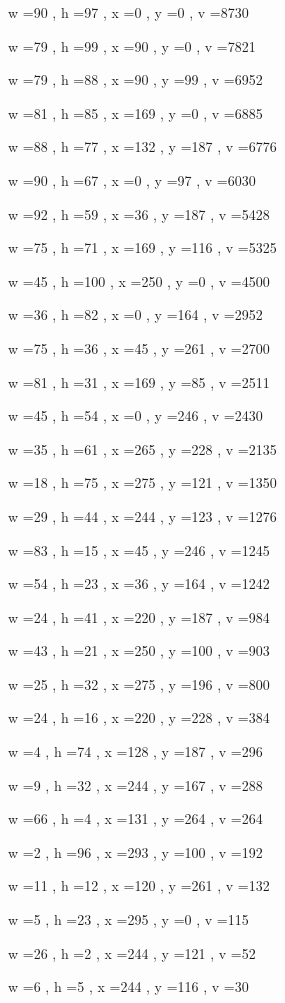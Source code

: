 \documentclass[11pt]{article}
\begin{document}
w =90 , h =97 , x =0 , y =0 , v =8730
\par
w =79 , h =99 , x =90 , y =0 , v =7821
\par
w =79 , h =88 , x =90 , y =99 , v =6952
\par
w =81 , h =85 , x =169 , y =0 , v =6885
\par
w =88 , h =77 , x =132 , y =187 , v =6776
\par
w =90 , h =67 , x =0 , y =97 , v =6030
\par
w =92 , h =59 , x =36 , y =187 , v =5428
\par
w =75 , h =71 , x =169 , y =116 , v =5325
\par
w =45 , h =100 , x =250 , y =0 , v =4500
\par
w =36 , h =82 , x =0 , y =164 , v =2952
\par
w =75 , h =36 , x =45 , y =261 , v =2700
\par
w =81 , h =31 , x =169 , y =85 , v =2511
\par
w =45 , h =54 , x =0 , y =246 , v =2430
\par
w =35 , h =61 , x =265 , y =228 , v =2135
\par
w =18 , h =75 , x =275 , y =121 , v =1350
\par
w =29 , h =44 , x =244 , y =123 , v =1276
\par
w =83 , h =15 , x =45 , y =246 , v =1245
\par
w =54 , h =23 , x =36 , y =164 , v =1242
\par
w =24 , h =41 , x =220 , y =187 , v =984
\par
w =43 , h =21 , x =250 , y =100 , v =903
\par
w =25 , h =32 , x =275 , y =196 , v =800
\par
w =24 , h =16 , x =220 , y =228 , v =384
\par
w =4 , h =74 , x =128 , y =187 , v =296
\par
w =9 , h =32 , x =244 , y =167 , v =288
\par
w =66 , h =4 , x =131 , y =264 , v =264
\par
w =2 , h =96 , x =293 , y =100 , v =192
\par
w =11 , h =12 , x =120 , y =261 , v =132
\par
w =5 , h =23 , x =295 , y =0 , v =115
\par
w =26 , h =2 , x =244 , y =121 , v =52
\par
w =6 , h =5 , x =244 , y =116 , v =30
\par
\newpage
\end{document}
